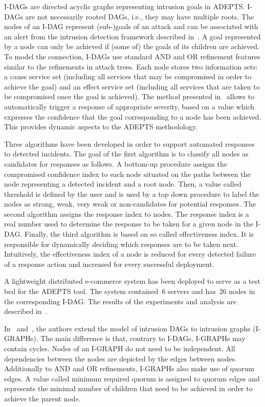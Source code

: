 \documentclass[a4paper]{article}
\begin{document}
I-DAGs are directed acyclic  graphs representing intrusion goals in ADEPTS. 
I-DAGs are not necessarily rooted DAGs, i.e., they may have multiple roots.  The
 nodes of an I-DAG represent (sub-)goals  of an attack and can be  associated
with an alert from the intrusion detection framework described 
in~\cite{conf/acsac/WuFMB03}. A goal represented by a node can only be achieved 
if (some of) the goals of its children are achieved. To model the connection, 
I-DAGs use standard AND and OR refinement features similar to the refinements 
in attack trees. Each node stores two information sets: a cause service set 
(including all services that may be compromised in order to  achieve the goal)
and an effect service set (including all services that are  taken to be
compromised once the goal is achieved). The method presented
in~\cite{BagchiTech} allows to automatically trigger a response of appropriate
severity, based on a value which expresses the confidence that the goal 
corresponding to a node has been achieved. This provides dynamic aspects to the 
ADEPTS methodology. 

Three algorithms have been developed in order to support automated responses to
detected incidents. The goal of the first algorithm is to classify all nodes as
candidates for responses as follows. A bottom-up procedure assigns the 
compromised confidence index to each node situated on the paths between the 
node representing a detected incident and a root node. Then, a value called 
threshold is defined by the user and is  used by a top down procedure to label
the nodes as strong, weak, very  weak or  non-candidates for potential
responses. The second algorithm assigns the  response index to nodes. The
response index is a real number used to  determine the response to be taken for
a given node in the I-DAG. Finally,  the third algorithm is  based on so called
effectiveness index. It is responsible for dynamically  deciding which responses
are to be taken next. Intuitively, the effectiveness  index of a node is reduced
for every detected failure of a response action and  increased for every
successful deployment.

A lightweight distributed e-commerce system has been deployed to serve as a 
test bed for the  ADEPTS tool. The system contained~$6$ servers and has~$26$
nodes in the  corresponding I-DAG. The results of the experiments and analysis
are  described in~\cite{BagchiTech}. 

In~\cite{FoWuMaBaSp} and~\cite{FoWuMaBaSpTech}, the authors extend the model of 
intrusion DAGs to intrusion graphs (I-GRAPHs). The main difference is that, 
contrary to I-DAGs, I-GRAPHs may contain cycles. Nodes of an I-GRAPH do not 
need to be independent. All dependencies between the nodes are depicted by the 
edges between nodes. Additionally to AND and OR refinements, I-GRAPHs also make 
use of quorum edges. A value called minimum required quorum is assigned to 
quorum edges and represents the minimal number of children that need to be 
achieved in order to achieve the parent node.
\end{document}
